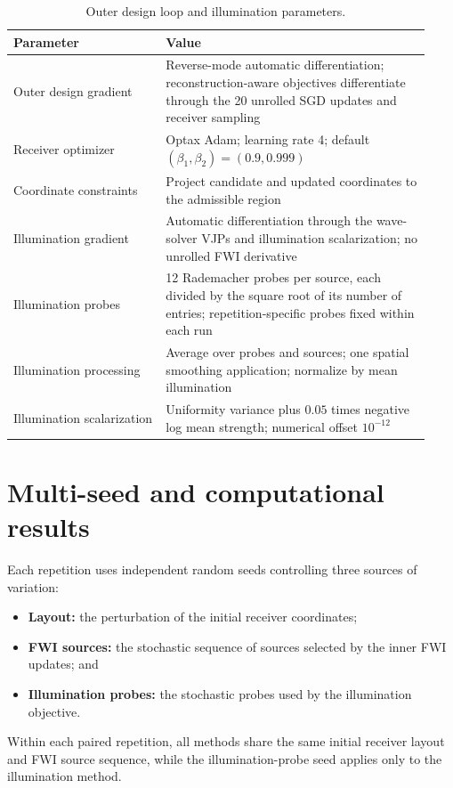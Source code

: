 \documentclass{article}
\begin{document}
\begin{table}[!htbp]
  \centering
  \small
  \caption{Outer design loop and illumination parameters.}
  \label{tab:outer-design-parameters}
  \begin{tabular}{@{}L{0.34\linewidth}L{0.59\linewidth}@{}}
    \toprule
    Parameter & Value \\
    \midrule
    Outer design gradient & Reverse-mode automatic differentiation; reconstruction-aware objectives differentiate through the 20 unrolled SGD updates and receiver sampling \\
    Receiver optimizer & Optax Adam; learning rate 4; default $(\beta_1,\beta_2)=(0.9,0.999)$ \\
    Coordinate constraints & Project candidate and updated coordinates to the admissible region \\
    Illumination gradient & Automatic differentiation through the wave-solver VJPs and illumination scalarization; no unrolled FWI derivative \\
    Illumination probes & 12 Rademacher probes per source, each divided by the square root of its number of entries; repetition-specific probes fixed within each run \\
    Illumination processing & Average over probes and sources; one spatial smoothing application; normalize by mean illumination \\
    Illumination scalarization & Uniformity variance plus $0.05$ times negative log mean strength; numerical offset $10^{-12}$ \\
    \bottomrule
  \end{tabular}
\end{table}

\clearpage
\section{Multi-seed and computational results}

Each repetition uses independent random seeds controlling three sources of
variation:
\begin{itemize}
  \item \textbf{Layout:} the perturbation of the initial receiver coordinates;
  \item \textbf{FWI sources:} the stochastic sequence of sources selected by
  the inner FWI updates; and
  \item \textbf{Illumination probes:} the stochastic probes used by the
  illumination objective.
\end{itemize}
Within each paired repetition, all methods share the same initial receiver
layout and FWI source sequence, while the illumination-probe seed applies only
to the illumination method.
\end{document}
